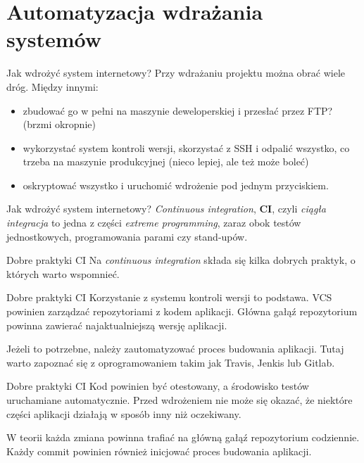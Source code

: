 \section{Automatyzacja wdrażania systemów}

\begin{frame}{Jak wdrożyć system internetowy?}
	Przy wdrażaniu projektu można obrać wiele dróg. Między innymi:
	
	\begin{itemize}
	\item zbudować go w pełni na maszynie deweloperskiej i przesłać przez FTP? (brzmi okropnie)
	\item wykorzystać system kontroli wersji, skorzystać z SSH i odpalić wszystko, co trzeba na maszynie produkcyjnej (nieco lepiej, ale też może boleć)
	\item oskryptować wszystko i uruchomić wdrożenie pod jednym przyciskiem.
	\end{itemize}
\end{frame}

\begin{frame}{Jak wdrożyć system internetowy?}
	\emph{Continuous integration}, \textbf{CI}, czyli \emph{ciągła integracja} to jedna z części \emph{extreme programming}, zaraz obok testów jednostkowych, programowania parami czy stand-upów.
\end{frame}

\begin{frame}{Dobre praktyki CI}
	Na \emph{continuous integration} składa się kilka dobrych praktyk, o których warto wspomnieć.
\end{frame}

\begin{frame}{Dobre praktyki CI}
	Korzystanie z systemu kontroli wersji to podstawa. VCS powinien zarządzać repozytoriami z kodem aplikacji. Główna gałąź repozytorium powinna zawierać najaktualniejszą wersję aplikacji.
	
	Jeżeli to potrzebne, należy zautomatyzować proces budowania aplikacji. Tutaj warto zapoznać się z oprogramowaniem takim jak Travis, Jenkis lub Gitlab.
\end{frame}

\begin{frame}{Dobre praktyki CI}
	Kod powinien być otestowany, a środowisko testów uruchamiane automatycznie. Przed wdrożeniem nie może się okazać, że niektóre części aplikacji działają w sposób inny niż oczekiwany.
	
	W teorii każda zmiana powinna trafiać na główną gałąź repozytorium codziennie. Każdy commit powinien również inicjować proces budowania aplikacji.
\end{frame}

